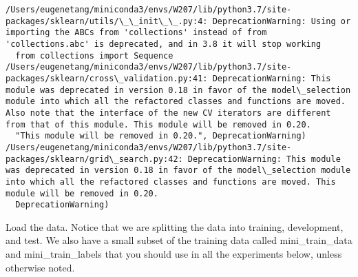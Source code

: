\documentclass[11pt]{article}
\begin{document}
    \begin{Verbatim}[commandchars=\\\{\}]
/Users/eugenetang/miniconda3/envs/W207/lib/python3.7/site-packages/sklearn/utils/\_\_init\_\_.py:4: DeprecationWarning: Using or importing the ABCs from 'collections' instead of from 'collections.abc' is deprecated, and in 3.8 it will stop working
  from collections import Sequence
/Users/eugenetang/miniconda3/envs/W207/lib/python3.7/site-packages/sklearn/cross\_validation.py:41: DeprecationWarning: This module was deprecated in version 0.18 in favor of the model\_selection module into which all the refactored classes and functions are moved. Also note that the interface of the new CV iterators are different from that of this module. This module will be removed in 0.20.
  "This module will be removed in 0.20.", DeprecationWarning)
/Users/eugenetang/miniconda3/envs/W207/lib/python3.7/site-packages/sklearn/grid\_search.py:42: DeprecationWarning: This module was deprecated in version 0.18 in favor of the model\_selection module into which all the refactored classes and functions are moved. This module will be removed in 0.20.
  DeprecationWarning)

    \end{Verbatim}

    Load the data. Notice that we are splitting the data into training,
development, and test. We also have a small subset of the training data
called mini\_train\_data and mini\_train\_labels that you should use in
all the experiments below, unless otherwise noted.
\end{document}

